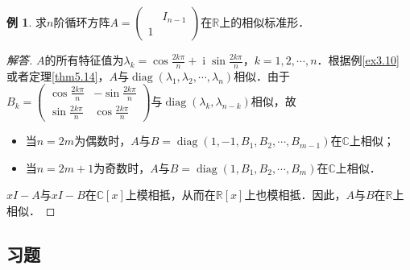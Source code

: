 \documentclass[a4paper,fontset=windows]{ctexbook}
\theoremstyle{definition}
\newtheorem{example}{例}[chapter]
\DeclareMathOperator{\diag}{diag}
\DeclareMathOperator{\I}{i}
\begin{document}
\begin{example}
求$n$阶循环方阵$A=\begin{pmatrix}&I_{n-1} \\ 1&\end{pmatrix}$在$\mathbb{R}$上的相似标准形．
\end{example}

\begin{proof}[解答]
$A$的所有特征值为$\lambda_k=\cos\frac{2k\pi}{n}+\I\sin\frac{2k\pi}{n}$，$k=1,2,\cdots,n$．根据例\ref{ex3.10} 或者定理\ref{thm5.14}，$A$与$\diag(\lambda_1,\lambda_2,\cdots,\lambda_n)$相似．由于$B_k=\begin{pmatrix}\cos\frac{2k\pi}{n}&-\sin\frac{2k\pi}{n} \\ \sin\frac{2k\pi}{n}&\cos\frac{2k\pi}{n}\end{pmatrix}$与$\diag(\lambda_k,\lambda_{n-k})$相似，故
\begin{itemize}
\item 当$n=2m$为偶数时，$A$与$B=\diag(1,-1,B_1,B_2,\cdots,B_{m-1})$在$\mathbb{C}$上相似；
\item 当$n=2m+1$为奇数时，$A$与$B=\diag(1,B_1,B_2,\cdots,B_m)$在$\mathbb{C}$上相似．
\end{itemize}
$xI-A$与$xI-B$在$\mathbb{C}[x]$上模相抵，从而在$\mathbb{R}[x]$上也模相抵．因此，$A$与$B$在$\mathbb{R}$上相似．
\end{proof}

\subsection*{习题}
\end{document}

